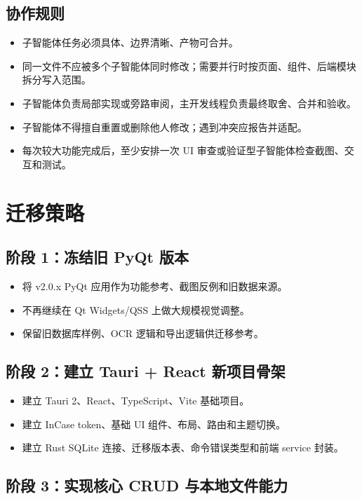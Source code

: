 \documentclass[UTF8,zihao=-4]{ctexart}
\begin{document}
\subsection{协作规则}

\begin{itemize}
  \item 子智能体任务必须具体、边界清晰、产物可合并。
  \item 同一文件不应被多个子智能体同时修改；需要并行时按页面、组件、后端模块拆分写入范围。
  \item 子智能体负责局部实现或旁路审阅，主开发线程负责最终取舍、合并和验收。
  \item 子智能体不得擅自重置或删除他人修改；遇到冲突应报告并适配。
  \item 每次较大功能完成后，至少安排一次 UI 审查或验证型子智能体检查截图、交互和测试。
\end{itemize}

\section{迁移策略}

\subsection{阶段 1：冻结旧 PyQt 版本}

\begin{itemize}
  \item 将 v2.0.x PyQt 应用作为功能参考、截图反例和旧数据来源。
  \item 不再继续在 Qt Widgets/QSS 上做大规模视觉调整。
  \item 保留旧数据库样例、OCR 逻辑和导出逻辑供迁移参考。
\end{itemize}

\subsection{阶段 2：建立 Tauri + React 新项目骨架}

\begin{itemize}
  \item 建立 Tauri 2、React、TypeScript、Vite 基础项目。
  \item 建立 InCase token、基础 UI 组件、布局、路由和主题切换。
  \item 建立 Rust SQLite 连接、迁移版本表、命令错误类型和前端 service 封装。
\end{itemize}

\subsection{阶段 3：实现核心 CRUD 与本地文件能力}
\end{document}
